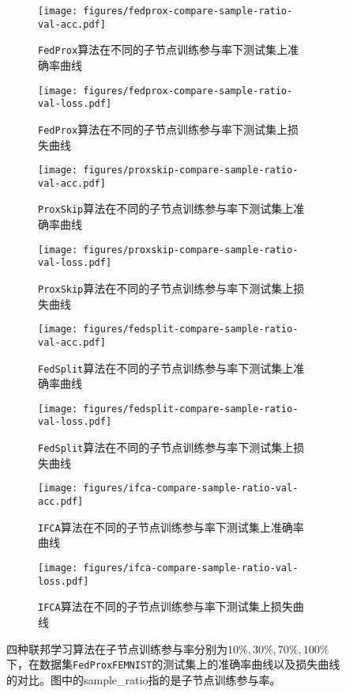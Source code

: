 \begin{figure}[ht]
\centering
\begin{subfigure}{.5\textwidth}
  \centering
  \texttt{[image: figures/fedprox-compare-sample-ratio-val-acc.pdf]}
  \caption{\texttt{FedProx}算法在不同的子节点训练参与率下测试集上准确率曲线}
  \label{fig:fedprox-compare-sample-ratio-val-acc}
\end{subfigure}%
\begin{subfigure}{.5\textwidth}
  \centering
  \texttt{[image: figures/fedprox-compare-sample-ratio-val-loss.pdf]}
  \caption{\texttt{FedProx}算法在不同的子节点训练参与率下测试集上损失曲线}
  \label{fig:fedprox-compare-sample-ratio-val-loss}
\end{subfigure}
\begin{subfigure}{.5\textwidth}
  \centering
  \texttt{[image: figures/proxskip-compare-sample-ratio-val-acc.pdf]}
  \caption{\texttt{ProxSkip}算法在不同的子节点训练参与率下测试集上准确率曲线}
  \label{fig:proxskip-compare-sample-ratio-val-acc}
\end{subfigure}%
\begin{subfigure}{.5\textwidth}
  \centering
  \texttt{[image: figures/proxskip-compare-sample-ratio-val-loss.pdf]}
  \caption{\texttt{ProxSkip}算法在不同的子节点训练参与率下测试集上损失曲线}
  \label{fig:proxskip-compare-sample-ratio-val-loss}
\end{subfigure}
\begin{subfigure}{.5\textwidth}
  \centering
  \texttt{[image: figures/fedsplit-compare-sample-ratio-val-acc.pdf]}
  \caption{\texttt{FedSplit}算法在不同的子节点训练参与率下测试集上准确率曲线}
  \label{fig:fedsplit-compare-sample-ratio-val-acc}
\end{subfigure}%
\begin{subfigure}{.5\textwidth}
  \centering
  \texttt{[image: figures/fedsplit-compare-sample-ratio-val-loss.pdf]}
  \caption{\texttt{FedSplit}算法在不同的子节点训练参与率下测试集上损失曲线}
  \label{fig:fedsplit-compare-sample-ratio-val-loss}
\end{subfigure}
\begin{subfigure}{.5\textwidth}
  \centering
  \texttt{[image: figures/ifca-compare-sample-ratio-val-acc.pdf]}
  \caption{\texttt{IFCA}算法在不同的子节点训练参与率下测试集上准确率曲线}
  \label{fig:ifca-compare-sample-ratio-val-acc}
\end{subfigure}%
\begin{subfigure}{.5\textwidth}
  \centering
  \texttt{[image: figures/ifca-compare-sample-ratio-val-loss.pdf]}
  \caption{\texttt{IFCA}算法在不同的子节点训练参与率下测试集上损失曲线}
  \label{fig:ifca-compare-sample-ratio-val-loss}
\end{subfigure}
\caption{四种联邦学习算法在子节点训练参与率分别为$10\%, 30\%, 70\%, 100\%$下，在数据集\texttt{FedProxFEMNIST}的测试集上的准确率曲线以及损失曲线的对比。图中的sample\_ratio指的是子节点训练参与率。}
\label{fig:compare-sample-ratio}
\end{figure}

